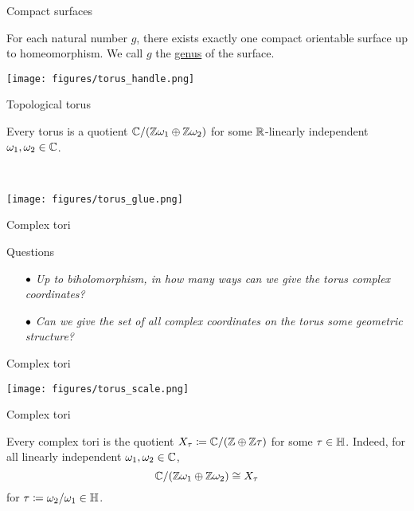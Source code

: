 \documentclass{beamer}
\begin{document}
    \begin{frame}{Compact surfaces}
        \begin{theorem}
            For each natural number $g$, there exists exactly one compact orientable surface up to homeomorphism. We call $g$ the \ul{genus} of the surface.
        \end{theorem}

        \pause

        \begin{center}
            \texttt{[image: figures/torus\_handle.png]}
        \end{center}
    \end{frame}
    \begin{frame}{Topological torus}
        \begin{theorem}
            Every torus is a quotient $\mathbb{C}/\!\left(\mathbb{Z}\omega_1\oplus\mathbb{Z}\omega_2\right)$ for some $\mathbb{R}$-linearly independent $\omega_1,\omega_2\in\mathbb{C}$.
        \end{theorem}

        \pause\ \\

        \begin{center}
            \texttt{[image: figures/torus\_glue.png]}
        \end{center}
    \end{frame}
    \begin{frame}{Complex tori}
        \begin{block}{Questions}
            \begin{itemize}
                \item[\scriptsize$\bullet$] \textit{Up to biholomorphism, in how many ways can we give the torus complex coordinates?}
                    \pause
                \item[\scriptsize$\bullet$] \textit{Can we give the set of all complex coordinates on the torus some geometric structure?}
            \end{itemize}
        \end{block}
    \end{frame}
    \begin{frame}{Complex tori}
        \begin{center}
            \texttt{[image: figures/torus\_scale.png]}
        \end{center}
    \end{frame}
    \begin{frame}{Complex tori}
        \begin{theorem}
            Every complex tori is the quotient $X_\tau\coloneqq\mathbb{C}/\!\left(\mathbb{Z}\oplus\mathbb{Z}\tau\right)$ for some $\tau\in\mathbb{H}$. \pause Indeed, for all linearly independent $\omega_1,\omega_2\in\mathbb{C}$,
            \begin{equation*}
                \mathbb{C}/\!\left(\mathbb{Z}\omega_1\oplus\mathbb{Z}\omega_2\right)\cong X_\tau
            \end{equation*}
            for $\tau\coloneqq\omega_2/\omega_1\in\mathbb{H}$.
        \end{theorem}
    \end{frame}
\end{document}
